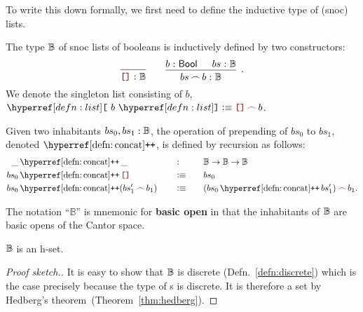 To write this down formally, we first need to define the inductive type of (snoc) lists.

\begin{defn}\label{defn:list}
  The type $\mathbb{B}{}$ of snoc lists of booleans is inductively defined by two
  constructors:
  \[
    \begin{prooftree}
      \hypo{\phantom{\bitlist}}
      \infer1{\oftyI{\emptylist{}}{\bitlist{}}}
    \end{prooftree}
    \qquad
    \begin{prooftree}
      \hypo{\oftyI{b}{\bool{}}}
      \hypo{\oftyI{bs}{\bitlist{}}}
      \infer2[.]{\oftyI{\snoc{bs}{b}}{\bitlist{}}}
    \end{prooftree}
  \]
  We denote the singleton list consisting of $b$,
      $\singleton{b} \is \snoc{\emptylist}{b}$.
\end{defn}

\begin{defn}\label{defn:concat}
  Given two inhabitants $bs_0, bs_1:\mathbb{B}{}$, the operation of prepending of
  $bs_0$ to $bs_1$, denoted $\concat$, is defined by recursion as follows:
  \begin{alignat*}{3}
    \_&\concat\_                      \quad&&:\quad   && \bitlist{} \rightarrow \bitlist{} \rightarrow \bitlist{} \\
    bs_0 &\concat \emptylist          \quad&&\is\quad && bs_0                                 \\
    bs_0 &\concat (\snoc{bs_1'}{b_1}) \quad&&\is\quad && \snoc{(bs_0 \concat bs_1')}{b_1}     .
  \end{alignat*}
\end{defn}

The notation ``$\mathbb{B}$'' is mnemonic for \textbf{basic open} in that the inhabitants
of $\mathbb{B}{}$ are basic opens of the Cantor space.

\begin{prop}\label{prop:list-set}
  $\mathbb{B}{}$ is an h-set.
\end{prop}
\begin{proof}[Proof sketch.]
  It is easy to show that $\mathbb{B}{}$ is discrete (Defn.~\ref{defn:discrete}) which is
  the case precisely because the type of \verbool{}s is discrete. It is therefore a set by
  Hedberg's theorem~(Theorem~\ref{thm:hedberg}).
\end{proof}

